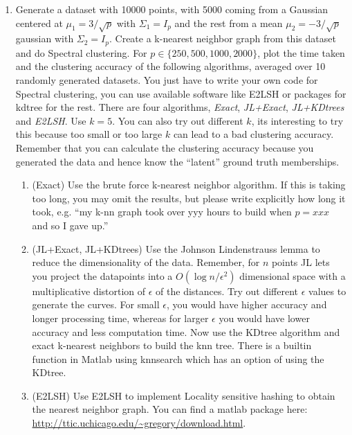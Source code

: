 \documentclass[11pt]{article}
\begin{document}
\begin{enumerate}

\begin{enumerate}
	\item Generate a dataset with 10000 points, with 5000 coming from a Gaussian centered at $\mu_1=3/\sqrt{p}$ with $\Sigma_1=I_p$ and the rest from a mean $\mu_2=-3/\sqrt{p}$ gaussian with $\Sigma_2=I_p$. Create a k-nearest neighbor graph from this dataset and do Spectral clustering. For $p\in\{250,500,1000,2000\}$, plot the time taken and the clustering accuracy of the following algorithms, averaged over 10 randomly generated datasets. You just have to write your own code for Spectral clustering, you can use available software like E2LSH or packages for kdtree for the rest. There are four algorithms, \textit{Exact}, \textit{JL+Exact}, \textit{JL+KDtrees} and \textit{E2LSH}. Use $k=5$. You can also try out different $k$, its interesting to try this because too small or too large $k$ can lead to a bad clustering accuracy. Remember that you can calculate the clustering accuracy because you generated the data and hence know the ``latent'' ground truth memberships.
\begin{enumerate}
	\item (Exact) Use the brute force k-nearest neighbor algorithm. If this is taking too long, you may omit the results, but please write explicitly how long it took, e.g. ``my k-nn graph took over yyy hours to build when $p=xxx$ and so I gave up.''
	\item (JL+Exact, JL+KDtrees) Use the Johnson Lindenstrauss lemma to reduce the dimensionality of the data. Remember, for $n$ points JL lets you project the datapoints into a $O(\log n/\epsilon^2)$ dimensional space with a multiplicative distortion of $\epsilon$ of the distances. Try out different $\epsilon$ values to generate the curves. For small $\epsilon$, you would have higher accuracy and longer processing time, whereas for larger $\epsilon$ you would have lower accuracy and less computation time. Now use the KDtree algorithm and exact k-nearest neighbors to build the knn tree. There is a builtin function in Matlab using knnsearch which has an option of using the KDtree.
	\item (E2LSH) Use E2LSH to implement Locality sensitive hashing to obtain the nearest neighbor graph. You can find a matlab package here:
	\url{http://ttic.uchicago.edu/~gregory/download.html}.
	\end{enumerate}
\end{enumerate}

\end{enumerate}
\end{document}
